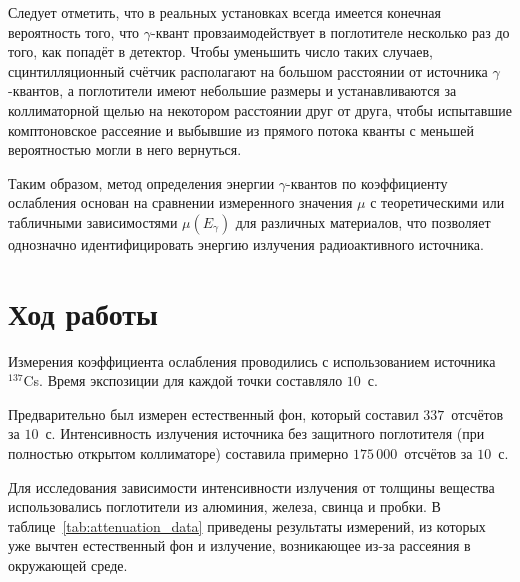 \documentclass[12pt,a4paper]{article}
\begin{document}
Следует отметить, что в реальных установках всегда имеется конечная вероятность того, что $\gamma$-квант провзаимодействует в поглотителе несколько раз до того, как попадёт в детектор. Чтобы уменьшить число таких случаев, сцинтилляционный счётчик располагают на большом расстоянии от источника $\gamma$-квантов, а поглотители имеют небольшие размеры и устанавливаются за коллиматорной щелью на некотором расстоянии друг от друга, чтобы испытавшие комптоновское рассеяние и выбывшие из прямого потока кванты с меньшей вероятностью могли в него вернуться.

Таким образом, метод определения энергии $\gamma$-квантов по коэффициенту ослабления основан на сравнении измеренного значения $\mu$ с теоретическими или табличными зависимостями $\mu(E_\gamma)$ для различных материалов, что позволяет однозначно идентифицировать энергию излучения радиоактивного источника.







\section*{Ход работы}

Измерения коэффициента ослабления проводились с использованием источника $^{137}$Cs. Время экспозиции для каждой точки составляло $10$~с. 

Предварительно был измерен естественный фон, который составил $337$~отсчётов за $10$~с. Интенсивность излучения источника без защитного поглотителя (при полностью открытом коллиматоре) составила примерно $175\,000$~отсчётов за $10$~с.

Для исследования зависимости интенсивности излучения от толщины вещества использовались поглотители из алюминия, железа, свинца и пробки. В таблице~\ref{tab:attenuation_data} приведены результаты измерений, из которых уже вычтен естественный фон и излучение, возникающее из-за рассеяния в окружающей среде. %
\end{document}
